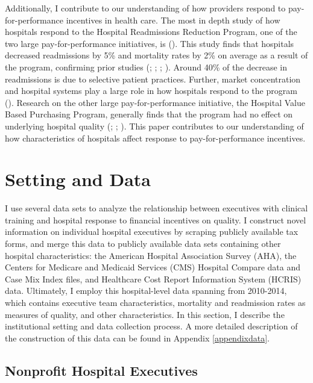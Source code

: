 \documentclass[12pt]{article}
\begin{document}
    Additionally, I contribute to our understanding of how providers respond to pay-for-performance incentives in health care. The most in depth study of how hospitals respond to the Hospital Readmissions Reduction Program, one of the two large pay-for-performance initiatives, is \citeauthor{gupta2021impacts} (\citeyear{gupta2021impacts}). This study finds that hospitals decreased readmissions by 5\% and mortality rates by 2\% on average as a result of the program, confirming prior studies (\cite{mellor2017does}; \cite{ziedan2018essays}; \cite{ody2019decreases}; \cite{gupta2021impacts}). Around 40\% of the decrease in readmissions is due to selective patient practices. Further, market concentration and hospital systems play a large role in how hospitals respond to the program (\cite{kunz2024assessing}). Research on the other large pay-for-performance initiative, the Hospital Value Based Purchasing Program, generally finds that the program had no effect on underlying hospital quality (\cite{us2015hospital}; \cite{norton2018moneyball}; \cite{friedson2019so}). This paper contributes to our understanding of how characteristics of hospitals affect response to pay-for-performance incentives. 

    \section{Setting and Data}

    I use several data sets to analyze the relationship between executives with clinical training and hospital response to financial incentives on quality. I construct novel information on individual hospital executives by scraping publicly available tax forms, and merge this data to publicly available data sets containing other hospital characteristics: the American Hospital Association Survey (AHA), the Centers for Medicare and Medicaid Services (CMS) Hospital Compare data and Case Mix Index files, and Healthcare Cost Report Information System (HCRIS) data. Ultimately, I employ this hospital-level data spanning from 2010-2014, which contains executive team characteristics, mortality and readmission rates as measures of quality, and other characteristics. In this section, I describe the institutional setting and data collection process. A more detailed description of the construction of this data can be found in Appendix \ref{appendixdata}. 

    \subsection{Nonprofit Hospital Executives}
\end{document}
